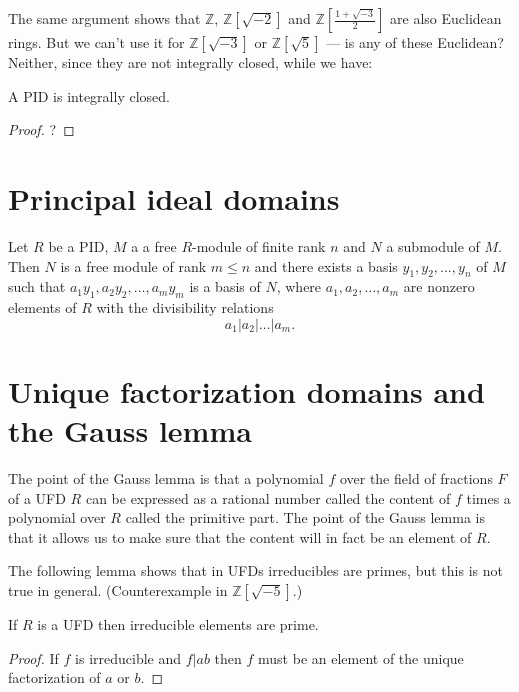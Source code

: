 \noindent
The same argument shows that
$\mathbb{Z}$,
$\mathbb{Z}[\sqrt{-2}]$ and
$\mathbb{Z}
\left[\frac{1+\sqrt{-3}}{2}\right]$
are also Euclidean rings.
But we can't use it for
$\mathbb{Z}[\sqrt{-3}]$
or $\mathbb{Z}[\sqrt{5}]$
--- is any of these Euclidean?
Neither, since they are not
integrally closed, while we have:

\begin{lemma}
\label{lemma-euclidan-is-ufd}
A PID is integrally closed.
\end{lemma}

\begin{proof}
?
\end{proof}

\section{Principal ideal domains}
\label{section-pid}

\begin{lemma}
\label{lemma-pid-free-module}
Let $R$ be a PID, $M$ a a free
$R$-module of finite rank $n$ and $N$ a
submodule of $M$. Then $N$ is a free module
of rank $m\leq n$ and there exists a basis
$y_1,y_2,\ldots,y_n$ of $M$ such that
$a_1y_1,a_2y_2,\ldots,a_my_m$ is a basis of
$N$, where $a_1,a_2,\ldots,a_m$ are nonzero
elements of $R$ with the divisibility
relations
$$
a_1|a_2|\ldots|a_m.
$$
\end{lemma}

\section{Unique factorization domains and
the
Gauss lemma}
\label{section-UFD}

The point of the Gauss lemma is that a
polynomial $f$ over the field of fractions
$F$ of a UFD $R$ can be expressed as a
rational number called the content of $f$
times a polynomial over $R$ called the
primitive part. The point of the Gauss
lemma is that it allows us to make sure that
the content will in fact be an
element of $R$.

\medskip\noindent
The following lemma shows that in UFDs
irreducibles are primes, but this is not
true in general. (Counterexample in
$\mathbb{Z}[\sqrt{-5}]$.)

\begin{lemma}
\label{lemma-irreducible-is-%
prime}
If $R$ is a UFD then irreducible elements are
prime.
\end{lemma}

\begin{proof}
If $f$ is irreducible and $f|ab$ then $f$
must be an element of the unique
factorization of $a$ or $b$.
\end{proof}

